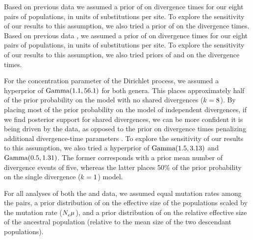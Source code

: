 Based on previous data \citep{Welton2010, Welton2010zootaxa, Siler2010} we
assumed a prior of  on divergence times for our eight pairs
of  populations, in units of substitutions per site.
To explore the sensitivity of our results to this assumption, we also
tried a prior of  on the divergence times.
Based on previous data \citep{Siler2012, Siler2014kikuchii}, we assumed a prior
of  on divergence times for our eight pairs of 
populations, in units of substitutions per site.
To explore the sensitivity of our results to this assumption, we also tried
priors of  and  on the 
divergence times.

For the concentration parameter of the Dirichlet process, we assumed
a hyperprior of $\textrm{Gamma}(1.1, 56.1)$ for both genera.
This places approximately half of the prior probability on the model
with no shared divergences ($k_{} = 8$).
By placing most of the prior probability on the model of independent
divergences, if we find posterior support for shared divergences, we can be
more confident it is being driven by the data,
as opposed to the prior on divergence times penalizing additional
divergence-time parameters
\citep{Jeffreys1939,Lindley1957,Oaks2012,Oaks2014reply}.
To explore the sensitivity of our results to this assumption, we also
tried a hyperprior of
$\textrm{Gamma}(1.5, 3.13)$
and
$\textrm{Gamma}(0.5, 1.31)$.
The former corresponds with a prior mean number of divergence events of five,
whereas the latter places 50\% of the prior probability on the single
divergence ($k_{} = 1$) model.

For all analyses of both the  and  data, we
assumed equal mutation rates among the pairs, a prior distribution of
 on the effective  size of the populations scaled
by the mutation rate ($N_{e}^{}{}\mu_{}{}$), and a
prior distribution of  on the relative effective size of the
ancestral population (relative to the mean size of the two descendant
populations).

